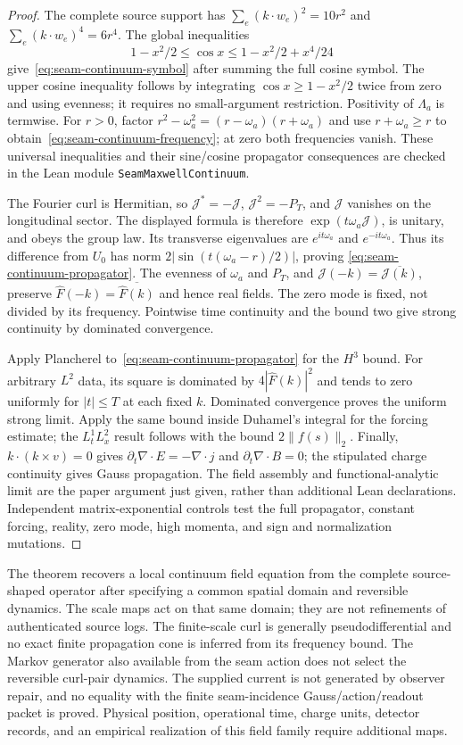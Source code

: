 \documentclass[11pt]{article}
\theoremstyle{remark}
\theoremstyle{plain}
\begin{document}
\begin{proof}
The complete source support has
$\sum_e(k\cdot w_e)^2=10r^2$ and
$\sum_e(k\cdot w_e)^4=6r^4$. The global inequalities
\[
 1-x^2/2\le\cos x\le1-x^2/2+x^4/24
\]
give~\eqref{eq:seam-continuum-symbol} after summing the full cosine symbol.
The upper cosine inequality follows by integrating
$\cos x\ge1-x^2/2$ twice from zero and using evenness; it requires no
small-argument restriction. Positivity of $\Lambda_a$ is termwise.
For $r>0$, factor $r^2-\omega_a^2=(r-\omega_a)(r+\omega_a)$ and use
$r+\omega_a\ge r$ to obtain~\eqref{eq:seam-continuum-frequency}; at zero
both frequencies vanish. These universal inequalities and their sine/cosine
propagator consequences are checked in the Lean module
\texttt{SeamMaxwellContinuum}.

The Fourier curl is Hermitian, so $\mathcal J^*=-\mathcal J$,
$\mathcal J^2=-P_T$, and $\mathcal J$ vanishes on the longitudinal sector.
The displayed formula is therefore $\exp(t\omega_a\mathcal J)$, is unitary,
and obeys the group law. Its transverse eigenvalues are
$e^{it\omega_a}$ and $e^{-it\omega_a}$. Thus its difference from $U_0$ has
norm $2|\sin(t(\omega_a-r)/2)|$, proving
\eqref{eq:seam-continuum-propagator}. The evenness of $\omega_a$ and $P_T$,
and $\mathcal J(-k)=\overline{\mathcal J(k)}$, preserve
$\widehat F(-k)=\overline{\widehat F(k)}$ and hence real fields.
The zero mode is fixed, not divided by its frequency. Pointwise time
continuity and the bound two give strong continuity by dominated convergence.

Apply Plancherel to~\eqref{eq:seam-continuum-propagator} for the $H^3$ bound.
For arbitrary $L^2$ data, its square is dominated by
$4|\widehat F(k)|^2$ and tends to zero uniformly for $|t|\le T$ at each
fixed $k$. Dominated convergence proves the uniform strong limit. Apply the
same bound inside Duhamel's integral for the forcing estimate; the
$L^1_tL^2_x$ result follows with the bound $2\|f(s)\|_2$. Finally,
$k\cdot(k\times v)=0$ gives
$\partial_t\nabla\cdot E=-\nabla\cdot j$ and
$\partial_t\nabla\cdot B=0$; the stipulated charge continuity gives Gauss
propagation. The field assembly and functional-analytic limit are the paper
argument just given, rather than additional Lean declarations. Independent
matrix-exponential controls test the full propagator, constant forcing,
reality, zero mode, high momenta, and sign and normalization mutations.
\end{proof}

The theorem recovers a local continuum field equation from the complete
source-shaped operator after specifying a common spatial domain and
reversible dynamics. The scale maps act on that same domain; they are not
refinements of authenticated source logs. The finite-scale curl is generally
pseudodifferential and no exact finite propagation cone is inferred from its
frequency bound. The Markov generator also available from the seam action
does not select the reversible curl-pair dynamics. The supplied current is
not generated by observer repair, and no equality with the finite
seam-incidence Gauss/action/readout packet is proved. Physical position,
operational time, charge units, detector records, and an empirical realization
of this field family require additional maps.
\end{document}
